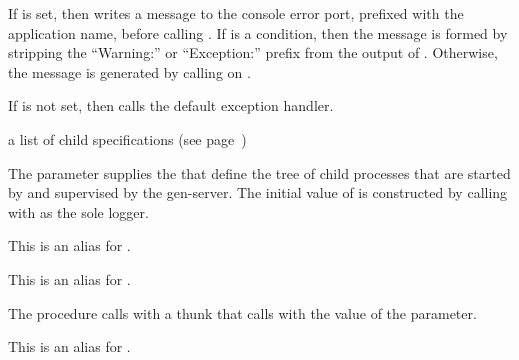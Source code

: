 If  is set, then  writes a
message to the console error port, prefixed with the application name,
before calling .
If  is a condition, then the message is formed by stripping the
``Warning:'' or ``Exception:'' prefix from the output of .
Otherwise, the message is generated by calling
on .

If  is not set, then 
calls the default exception handler.

\begin{parameter}
\end{parameter}
\hasvalue{} a list of child specifications (see page~\pageref{page:child-spec})

The  parameter supplies the 
that define the tree of child processes that are started by
 and supervised by the  gen-server.
The initial value of  is constructed by calling
 with  as the
sole logger.

\begin{syntax}
\end{syntax}

This is an alias for .

\begin{syntax}
\end{syntax}

This is an alias for .

\begin{procedure}
\end{procedure}
\returns{} 

The  procedure calls 
with a  thunk that calls 
with the value of the  parameter.

\begin{syntax}
\end{syntax}

This is an alias for .

